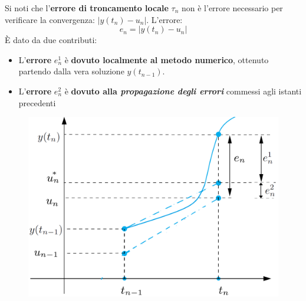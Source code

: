 \highspace
Si noti che l'\textbf{errore di troncamento locale} $\tau_{n}$ non è l'errore necessario per verificare la convergenza: $\left|y\left(t_{n}\right) - u_{n}\right|$. L'errore:
\begin{equation*}
	e_{n} = \left|y\left(t_{n}\right) - u_{n}\right|
\end{equation*}
È dato da due contributi:
\begin{itemize}
	\item L'\textbf{errore} $e_{n}^{1}$ è \textbf{dovuto localmente al metodo numerico}, ottenuto partendo dalla vera soluzione $y\left(t_{n-1}\right)$.
	
	\item L'\textbf{errore} $e_{n}^{2}$ è \textbf{dovuto alla \emph{propagazione degli errori}} commessi agli istanti precedenti
\end{itemize}
\begin{figure}[!htp]
	\centering
	\includegraphics[width=.6\textwidth]{img/convergenza-2.png}
\end{figure}

\newpage

